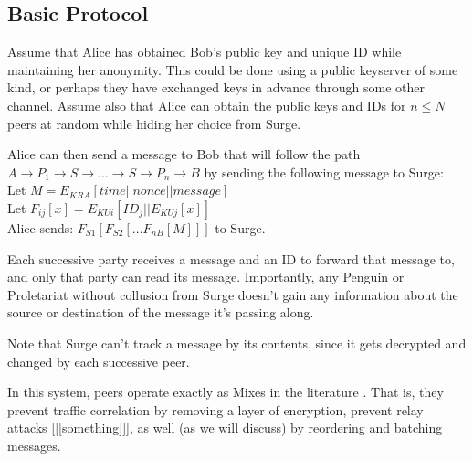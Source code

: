 \documentclass[twocolumn,11pt,english]{paper}
\begin{document}
\subsection{Basic Protocol}
Assume that Alice has obtained Bob's public key and unique ID while maintaining her anonymity. This could be done using a public keyserver of some kind, or perhaps they have exchanged keys in advance through some other channel. Assume also that Alice can obtain the public keys and IDs for $n \le N$ peers at random while hiding her choice from Surge. 

Alice can then send a message to Bob that will follow the path $A \rightarrow P_1 \rightarrow S \rightarrow ... \rightarrow S \rightarrow P_n \rightarrow B$ by sending the following message to Surge: 
\\
Let $M = E_{KRA}[  time || nonce || message ]$
\\Let $F_{ij}[x] = E_{KUi}[ ID_j || E_{KUj}[ x ] ]$
\\
Alice sends: $F_{S1}[F_{S2}[...F_{nB}[ M ]]]$ to Surge. 

Each successive party receives a message and an ID to forward that message to, and only that party can read its message. Importantly, any Penguin or Proletariat without collusion from Surge doesn't gain any information about the source or destination of the message it's passing along. 

Note that Surge can't track a message by its contents, since it gets decrypted and changed by each successive peer. 

In this system, peers operate exactly as Mixes in the literature \cite{chaum-mix} . That is, they prevent traffic correlation by removing a layer of encryption, prevent relay attacks [[[something]]], as well (as we will discuss) by reordering and batching messages. 
\end{document}
